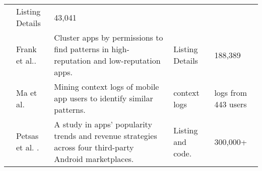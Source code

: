 \begin{longtable}{| c | p{3cm} | p{6cm} | p{2cm} | p{1.5cm} |}
	& Listing Details
	& 43,041
	\tabularnewline
	\cline{2-5}
	& Frank et al.\cite{Frank_2012_ICDM}.
	& Cluster apps by permissions to find patterns in high-reputation and low-reputation apps.
	& Listing Details
	& 188,389
	\tabularnewline
	\cline{2-5}
	& Ma et al.\cite{Ma_WWW_2012}
	& Mining context logs of mobile app users to identify similar patterns.
	& context logs
	& logs from 443 users
	\tabularnewline
	\cline{2-5}
	& Petsas et al. \cite{Petsas_2013_IMC}.
	&  A study in apps' popularity trends and revenue strategies across four third-party Android marketplaces.
	& Listing and code.
	& 300,000+
	\\
	\hline
\end{longtable}